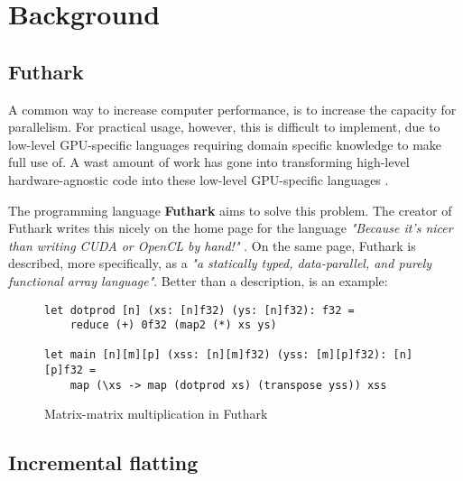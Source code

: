 \section{Background}
\subsection{Futhark}
A common way to increase computer performance, is to increase the capacity for parallelism. For practical usage, however, this is difficult to implement, due to low-level GPU-specific languages requiring domain specific knowledge to make full use of. A wast amount of work has gone into transforming high-level hardware-agnostic code into these low-level GPU-specific languages \cite{inc-flat}. 

The programming language \textbf{Futhark} aims to solve this problem. The creator of Futhark writes this nicely on the home page for the language \textit{"Because it’s nicer than writing CUDA or OpenCL by hand!"} \cite{futhark-home}. On the same page, Futhark is described, more specifically, as a \textit{"a statically typed, data-parallel, and purely functional array language"}. Better than a description, is an example:
\begin{figure}[H]
\centering
\begin{lstlisting}
let dotprod [n] (xs: [n]f32) (ys: [n]f32): f32 =
	reduce (+) 0f32 (map2 (*) xs ys)

let main [n][m][p] (xss: [n][m]f32) (yss: [m][p]f32): [n][p]f32 =
	map (\xs -> map (dotprod xs) (transpose yss)) xss
\end{lstlisting}%
\caption{Matrix-matrix multiplication in Futhark \cite{ppopp}}
\label{matmultFuthark}
\end{figure}
\noindent 



\subsection{Incremental flatting}
 
